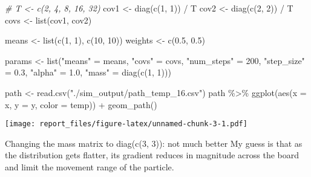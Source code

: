 \documentclass[
]{article}
\newenvironment{Shaded}{\begin{snugshade}}{\end{snugshade}}
\newcommand{\AttributeTok}[1]{\textcolor[rgb]{0.77,0.63,0.00}{#1}}
\newcommand{\CommentTok}[1]{\textcolor[rgb]{0.56,0.35,0.01}{\textit{#1}}}
\newcommand{\DecValTok}[1]{\textcolor[rgb]{0.00,0.00,0.81}{#1}}
\newcommand{\FloatTok}[1]{\textcolor[rgb]{0.00,0.00,0.81}{#1}}
\newcommand{\FunctionTok}[1]{\textcolor[rgb]{0.00,0.00,0.00}{#1}}
\newcommand{\NormalTok}[1]{#1}
\newcommand{\OtherTok}[1]{\textcolor[rgb]{0.56,0.35,0.01}{#1}}
\newcommand{\SpecialCharTok}[1]{\textcolor[rgb]{0.00,0.00,0.00}{#1}}
\newcommand{\StringTok}[1]{\textcolor[rgb]{0.31,0.60,0.02}{#1}}
\begin{document}
\begin{Shaded}
\begin{Highlighting}[]
\CommentTok{\# T \textless{}{-} c(2, 4, 8, 16, 32)}
\NormalTok{cov1 }\OtherTok{\textless{}{-}} \FunctionTok{diag}\NormalTok{(}\FunctionTok{c}\NormalTok{(}\DecValTok{1}\NormalTok{, }\DecValTok{1}\NormalTok{)) }\SpecialCharTok{/}\NormalTok{ T}
\NormalTok{cov2 }\OtherTok{\textless{}{-}} \FunctionTok{diag}\NormalTok{(}\FunctionTok{c}\NormalTok{(}\DecValTok{2}\NormalTok{, }\DecValTok{2}\NormalTok{)) }\SpecialCharTok{/}\NormalTok{ T}
\NormalTok{covs }\OtherTok{\textless{}{-}} \FunctionTok{list}\NormalTok{(cov1, cov2)}

\NormalTok{means }\OtherTok{\textless{}{-}} \FunctionTok{list}\NormalTok{(}\FunctionTok{c}\NormalTok{(}\DecValTok{1}\NormalTok{, }\DecValTok{1}\NormalTok{), }\FunctionTok{c}\NormalTok{(}\DecValTok{10}\NormalTok{, }\DecValTok{10}\NormalTok{))}
\NormalTok{weights }\OtherTok{\textless{}{-}} \FunctionTok{c}\NormalTok{(}\FloatTok{0.5}\NormalTok{, }\FloatTok{0.5}\NormalTok{)}

\NormalTok{params }\OtherTok{\textless{}{-}} \FunctionTok{list}\NormalTok{(}\StringTok{"means"} \OtherTok{=}\NormalTok{ means, }\StringTok{"covs"} \OtherTok{=}\NormalTok{ covs,}
               \StringTok{"num\_steps"} \OtherTok{=} \DecValTok{200}\NormalTok{,}
               \StringTok{"step\_size"} \OtherTok{=} \FloatTok{0.3}\NormalTok{,}
               \StringTok{"alpha"} \OtherTok{=} \FloatTok{1.0}\NormalTok{,}
               \StringTok{"mass"} \OtherTok{=} \FunctionTok{diag}\NormalTok{(}\FunctionTok{c}\NormalTok{(}\DecValTok{1}\NormalTok{, }\DecValTok{1}\NormalTok{)))}

\NormalTok{path }\OtherTok{\textless{}{-}} \FunctionTok{read.csv}\NormalTok{(}\StringTok{"./sim\_output/path\_temp\_16.csv"}\NormalTok{)}
\NormalTok{path }\SpecialCharTok{\%\textgreater{}\%} \FunctionTok{ggplot}\NormalTok{(}\FunctionTok{aes}\NormalTok{(}\AttributeTok{x =}\NormalTok{ x, }\AttributeTok{y =}\NormalTok{ y, }\AttributeTok{color =}\NormalTok{ temp)) }\SpecialCharTok{+} \FunctionTok{geom\_path}\NormalTok{()}
\end{Highlighting}
\end{Shaded}

\texttt{[image: report\_files/figure-latex/unnamed-chunk-3-1.pdf]}

Changing the mass matrix to diag(c(3, 3)): not much better My guess is
that as the distribution gets flatter, its gradient reduces in magnitude
across the board and limit the movement range of the particle.
\end{document}
